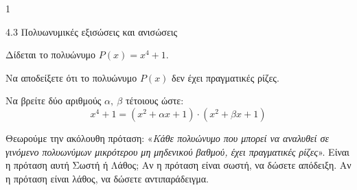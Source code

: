 \begin{ylh}{1}
\item 4.3 Πολυωνυμικές εξισώσεις και ανισώσεις
\end{ylh}
Δίδεται το πολυώνυμο $P(x) = x^{4} + 1$.
\begin{alist}
\item Να αποδείξετε ότι το πολυώνυμο $P(x)$ δεν έχει πραγματικές ρίζες.
\item Να βρείτε δύο αριθμούς $\alpha,\ \beta$ τέτοιους ώστε:
\begin{equation*}x^{4} + 1 = \left( x^{2} + \alpha x + 1 \right) \cdot \left( x^{2} + \beta x + 1 \right)\end{equation*}
\item Θεωρούμε την ακόλουθη πρόταση: «\emph{Κάθε πολυώνυμο που μπορεί να αναλυθεί σε γινόμενο πολυωνύμων μικρότερου μη μηδενικού βαθμού, έχει πραγματικές ρίζες}». Είναι η πρόταση αυτή Σωστή ή Λάθος; Αν η πρόταση είναι σωστή, να δώσετε απόδειξη. Αν η πρόταση είναι λάθος, να δώσετε αντιπαράδειγμα.
\end{alist}


